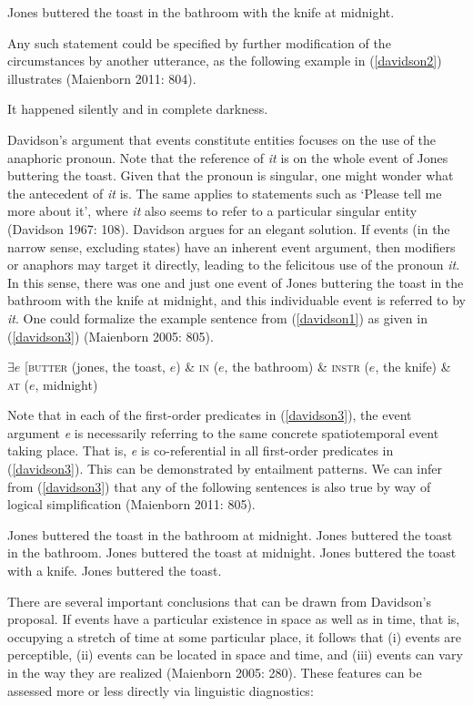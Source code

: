 \ea \label{davidson1}
Jones buttered the toast in the bathroom with the knife at midnight.
\z

Any such statement could be specified by further modification of the circumstances by another utterance, as the following example in (\ref{davidson2}) illustrates (Maienborn 2011: 804). 

\ea \label{davidson2}
It happened silently and in complete darkness.
\z

Davidson's argument that events constitute entities focuses on the use of the anaphoric pronoun. Note that the reference of \textit{it} is on the whole event of Jones buttering the toast. Given that the pronoun is singular, one might wonder what the antecedent of \textit{it} is. The same applies to statements such as `Please tell me more about it', where \textit{it} also seems to refer to a particular singular entity (Davidson 1967: 108). Davidson argues for an elegant solution. If events (in the narrow sense, excluding states) have an inherent event argument, then modifiers or anaphors may target it directly, leading to the felicitous use of the pronoun \textit{it}. In this sense, there was one and just one event of Jones buttering the toast in the bathroom with the knife at midnight, and this individuable event is referred to by \textit{it}. One could formalize the example sentence from (\ref{davidson1}) as given in (\ref{davidson3}) (Maienborn 2005: 805).

\ea \label{davidson3}
$\exists e$ [\textsc{butter} (jones, the toast, $e$) \& \textsc{in} ($e$, the bathroom) \& \textsc{instr} ($e$, the knife) \& \textsc{at} ($e$, midnight)
\z

Note that in each of the first-order predicates in (\ref{davidson3}), the event argument \emph{e} is necessarily referring to the same concrete spatiotemporal event taking place. That is, \emph{e} is co-referential in all first-order predicates in (\ref{davidson3}). This can be demonstrated by entailment patterns. We can infer from (\ref{davidson3}) that any of the following sentences is also true by way of logical simplification (Maienborn 2011: 805).

\ea
\ea Jones buttered the toast in the bathroom at midnight.
\ex Jones buttered the toast in the bathroom.
\ex Jones buttered the toast at midnight.
\ex Jones buttered the toast with a knife.
\ex Jones buttered the toast.
\z
\z

There are several important conclusions that can be drawn from Davidson's proposal. If events have a particular existence in space as well as in time, that is, occupying a stretch of time at some particular place, it follows that (i) events are perceptible, (ii) events can be located in space and time, and (iii) events can vary in the way they are realized (Maienborn 2005: 280). These features can be assessed more or less directly via linguistic diagnostics:

